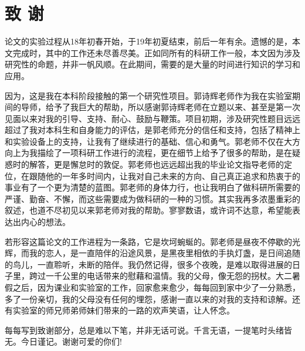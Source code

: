 

\chapter*{致 \quad 谢}

论文的实验过程从18年初春开始，于19年初夏结束，前后一年有余。遗憾的是，本文完成时，其中的工作还未尽善尽美。正如同所有的科研工作一般，本文因为涉及研究性的命题，并非一帆风顺。在此期间，需要的是大量的时间进行知识的学习和应用。

因为，这是我在本科阶段接触的第一个研究性项目。郭诗辉老师作为我在实验室期间的导师，给予了我巨大的帮助，所以感谢郭诗辉老师在立题以来、甚至是第一次见面以来对我的引导、支持、耐心、鼓励与鞭策。项目初期，涉及研究性题目远远超过了我对本科生和自身能力的评估，是郭老师充分的信任和支持，包括了精神上和实验设备上的支持，让我有了继续进行的基础、信心和勇气。郭老师不仅在大方向上为我描绘了一项科研工作进行的流程，更在细节上给予了很多的帮助，是在疑惑时的解答，更是懈怠时的敦促。郭老师也远远超出我的毕业论文指导老师的定位，在跟随他的一年多时间内，让我对自己未来的方向、自己真正追求和热衷于的事业有了一个更为清楚的蓝图。郭老师的身体力行，也让我明白了做科研所需要的严谨、勤奋、不懈，而这些需要成为做科研的一种的习惯。其实我再多浓墨重彩的叙述，也道不尽初见以来郭老师对我的帮助。寥寥数语，或许词不达意，希望能表达出内心的想法。

若形容这篇论文的工作进程为一条路，它是坎坷蜿蜒的。郭老师是昼夜不停歇的光辉，而我的恋人，是一直陪伴的沿途风景，是黑夜里相依的手执灯盏，是日间追随的鸟儿，一直聆听，未断的陪伴。我仍然记得，很多个夜晚，是难以取得进展的日子里，跨过一千公里的电话带来的慰藉和温情。我的父母，像无怨的拐杖。大二暑假之后，因为课业和实验室的工作，回家愈来愈少，每每回到家中少了一分熟悉，多了一份亲切，我的父母没有任何的埋怨，感谢一直以来的对我的支持和谅解。还有实验室的师兄师弟师妹们带来的一路的欢声笑语，让人怀念。

每每写到致谢部分，总是难以下笔，并非无话可说。千言无语，一提笔时头绪皆无。今日谨记。谢谢可爱的你们!

%
%
%
